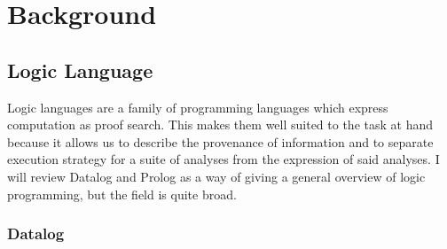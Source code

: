 \chapter{Background}
\label{chap:background}
\section{Logic Language}
Logic languages are a family of programming languages which express computation as proof search.
This makes them well suited to the task at hand because it allows us to describe the provenance of information and to separate execution strategy for a suite of analyses from the expression of said analyses.
I will review Datalog and Prolog as a way of giving a general overview of logic programming, but the field is quite broad.
\subsection{Datalog}
\label{sec:fchain}
